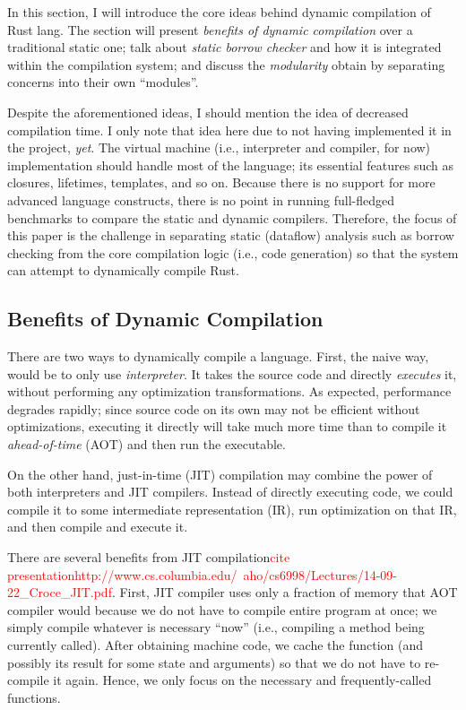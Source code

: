 
In this section, I will introduce the core ideas behind dynamic compilation
of Rust lang. The section will present \textit{benefits of 
dynamic compilation} over a traditional static one; talk about 
\textit{static borrow checker} and how it is integrated within the compilation
system; and discuss the \textit{modularity} obtain by separating concerns
into their own ``modules''.

Despite the aforementioned ideas, I should mention the idea of 
decreased compilation time. I only note that idea here due to
not having implemented it in the project, \textit{yet}. The virtual machine 
(i.e., interpreter and compiler, for now) implementation should
handle most of the language; its essential features such as closures,
lifetimes, templates, and so on. Because there is no support for more
advanced language constructs, there is no point in running
full-fledged benchmarks to compare the static and dynamic
compilers. Therefore, the focus of this paper is the challenge in separating
static (dataflow) analysis such as borrow checking from the core compilation
logic (i.e., code generation) so that the system can attempt to 
dynamically compile Rust.

\subsection{Benefits of Dynamic Compilation}

There are two ways to dynamically compile a language.
First, the naive way, would be to only use \textit{interpreter}. It takes
the source code and directly \textit{executes} it, without performing
any optimization transformations. As expected,
performance degrades rapidly; since source code on its own
may not be efficient without optimizations, executing it directly
will take much more time than to compile it \textit{ahead-of-time} (AOT) and
then run the executable.

On the other hand, just-in-time (JIT) compilation may combine the power of 
both interpreters and JIT compilers. Instead of directly executing code,
we could compile it to some intermediate representation (IR), run optimization
on that IR, and then compile and execute it.

There are several benefits from JIT compilation\textcolor{red}{cite presentationhttp://www.cs.columbia.edu/~aho/cs6998/Lectures/14-09-22\_Croce\_JIT.pdf}. First, JIT compiler uses
only a fraction of memory that AOT compiler would because we do not have
to compile entire program at once; we simply compile whatever is necessary 
``now'' (i.e., compiling a method being currently called). After obtaining
machine code, we cache the function (and possibly its result for some
state and arguments) so that we do not have to re-compile it again. Hence,
we only focus on the necessary and frequently-called functions.

